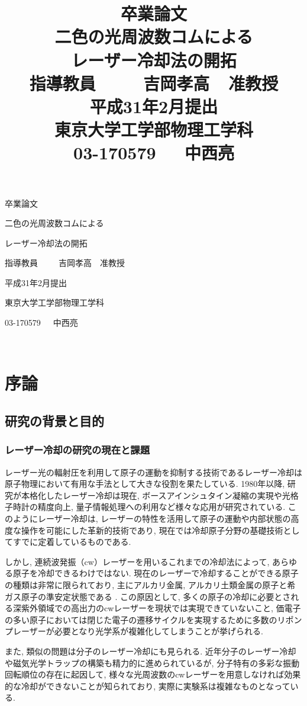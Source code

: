 \documentclass[uplatex, dvipdfmx, a4paper, report, papersize, 11pt]{jsbook}
\title{\fontsize{24.88pt}{0pt}\selectfont 卒業論文 \vspace{2cm}\\ 二色の光周波数コムによる\vspace{4mm}\\ レーザー冷却法の開拓 \vspace{3cm}\\ \fontsize{17.28pt}{0pt}\selectfont 指導教員\ \ \ \ \ 吉岡孝高\ \ 准教授 \vspace{4cm}\\ \fontsize{17.28pt}{0pt}\selectfont  平成31年2月提出 \vspace{2cm} \\ \fontsize{17.28pt}{0pt}\selectfont 東京大学工学部物理工学科 \vspace{3mm} \\ 03-170579\ \ \ 中西亮}
\date{}
\begin{document}
\begin{center}
  \Huge 卒業論文 \par
  \vspace{20mm}
  \Huge 二色の光周波数コムによる \par
  \vspace{4mm}
  \Huge レーザー冷却法の開拓 \par
  \vspace{30mm}
  \LARGE 指導教員\ \ \ \ \ 吉岡孝高\ \ 准教授\par
  \vspace{30mm}
  \LARGE 平成31年2月提出\par
  \vspace{15mm}
  \LARGE 東京大学工学部物理工学科 \par
  \vspace{10mm}
  \LARGE 03-170579\ \ \ 中西亮
  \vspace{10mm}
\end{center}
\thispagestyle{empty}
\clearpage
\addtocounter{page}{-2}
\newpage
\thispagestyle{empty}
　
\newpage


\setcounter{tocdepth}{2}
\tableofcontents


\newpage
\chapter{序論}
\section{研究の背景と目的}
\subsection{レーザー冷却の研究の現在と課題}
レーザー光の輻射圧を利用して原子の運動を抑制する技術であるレーザー冷却は原子物理において有用な手法として大きな役割を果たしている. 1980年以降, 研究が本格化したレーザー冷却は現在, ボースアインシュタイン凝縮の実現や光格子時計の精度向上, 量子情報処理への利用など様々な応用が研究されている\cite{レーザー冷却とその応用}. このようにレーザー冷却は, レーザーの特性を活用して原子の運動や内部状態の高度な操作を可能にした革新的技術であり, 現在では冷却原子分野の基礎技術としてすでに定着しているものである. \par
しかし, 連続波発振（cw）レーザーを用いるこれまでの冷却法によって, あらゆる原子を冷却できるわけではない. 現在のレーザーで冷却することができる原子の種類は非常に限られており, 主にアルカリ金属, アルカリ土類金属の原子と希ガス原子の準安定状態である \cite{PhysRevA.73.063407}. この原因として, 多くの原子の冷却に必要とされる深紫外領域での高出力のcwレーザーを現状では実現できていないこと, 価電子の多い原子においては閉じた電子の遷移サイクルを実現するために多数のリポンプレーザーが必要となり光学系が複雑化してしまうことが挙げられる.\par
また, 類似の問題は分子のレーザー冷却にも見られる. 近年分子のレーザー冷却や磁気光学トラップの構築も精力的に進められているが, 分子特有の多彩な振動回転順位の存在に起因して, 様々な光周波数のcwレーザーを用意しなければ効果的な冷却ができないことが知られており, 実際に実験系は複雑なものとなっている.
\end{document}
